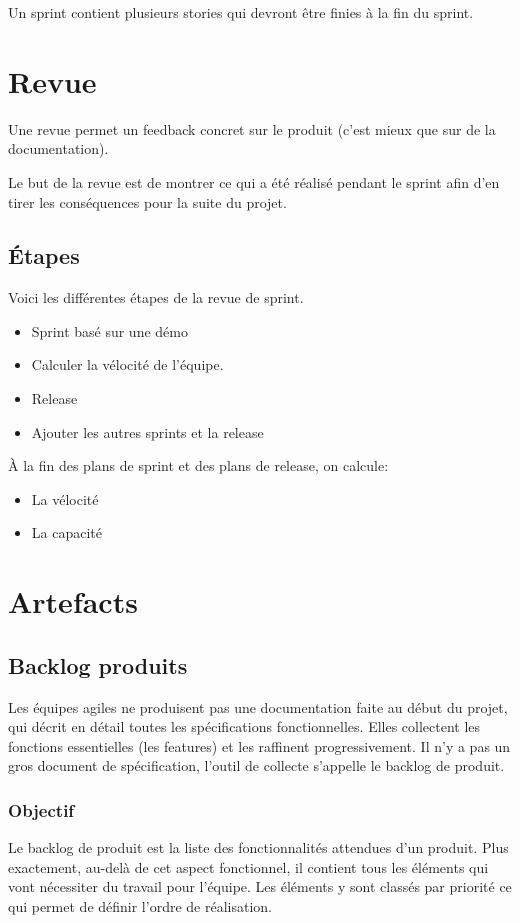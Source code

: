 		Un sprint contient plusieurs stories qui devront être finies à la fin du sprint.
		\newpage	
	\section{Revue}
		Une revue permet un feedback concret sur le produit (c'est mieux que sur de la documentation).

		Le but de la revue est de montrer ce qui a été réalisé pendant le sprint afin d'en tirer les conséquences pour la suite du projet.
		\subsection{Étapes}
			Voici les différentes étapes de la revue de sprint.
			\begin{itemize}
				\item Sprint basé sur une démo 
				\item Calculer la vélocité de l'équipe.
				\item Release 
				\item Ajouter les autres sprints et la release
			\end{itemize}
			À la fin des plans de sprint et des plans de release, on calcule: 
			\begin{itemize}
				\item La vélocité
				\item La capacité
			\end{itemize}
	\section{Artefacts}
		\subsection{Backlog produits}
			Les équipes agiles ne produisent pas une documentation faite au début du projet, qui décrit en détail toutes les spécifications fonctionnelles. 
			Elles collectent les fonctions essentielles (les features) et les raffinent progressivement. Il n'y a pas un gros document de spécification, l'outil de collecte s'appelle le backlog de produit.
		\subsubsection{Objectif}
			Le backlog de produit est la liste des fonctionnalités attendues d'un produit. Plus exactement, au-delà de cet aspect fonctionnel, 
			il contient tous les éléments qui vont nécessiter du travail pour l'équipe. Les éléments y sont classés par priorité ce qui permet de définir l'ordre de réalisation.
